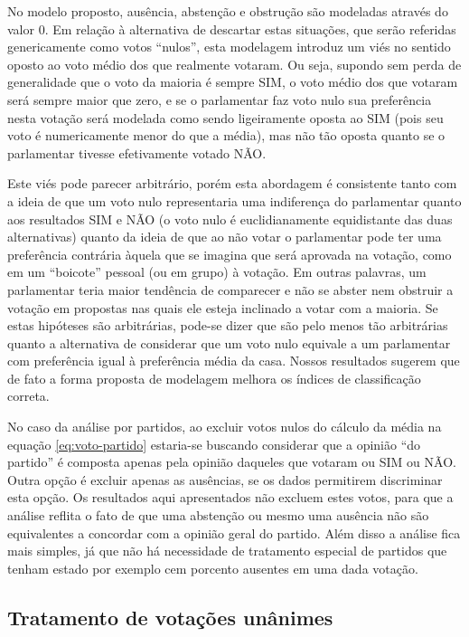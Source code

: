 \documentclass[a4paper, 12pt]{article}
\begin{document}
No modelo proposto, ausência, abstenção e obstrução são modeladas através do valor 0. Em relação à alternativa de descartar estas situações, que serão referidas genericamente como votos ``nulos'', esta modelagem introduz um viés no sentido oposto ao voto médio dos que realmente votaram. Ou seja, supondo sem perda de generalidade que o voto da maioria é sempre SIM, o voto médio dos que votaram será sempre maior que zero, e se o parlamentar faz voto nulo sua preferência nesta votação será modelada como sendo ligeiramente oposta ao SIM (pois seu voto é numericamente menor do que a média), mas não tão oposta quanto se o parlamentar tivesse efetivamente votado NÃO.

Este viés pode parecer arbitrário, porém esta abordagem é consistente tanto com a ideia de que um voto nulo representaria uma indiferença do parlamentar quanto aos resultados SIM e NÃO (o voto nulo é euclidianamente equidistante das duas alternativas) quanto da ideia de que ao não votar o parlamentar pode ter uma preferência contrária àquela que se imagina que será aprovada na votação, como em um ``boicote'' pessoal (ou em grupo) à votação. Em outras palavras, um parlamentar teria maior tendência de comparecer e não se abster nem obstruir a votação em propostas nas quais ele esteja inclinado a votar com a maioria. Se estas hipóteses são arbitrárias, pode-se dizer que são pelo menos tão arbitrárias quanto a alternativa de considerar que um voto nulo equivale a um parlamentar com preferência igual à preferência média da casa. Nossos resultados sugerem que de fato a forma proposta de modelagem melhora os índices de classificação correta.

No caso da análise por partidos, ao excluir votos nulos do cálculo da média na equação \ref{eq:voto-partido} estaria-se buscando considerar que a opinião ``do partido'' é composta apenas pela opinião daqueles que votaram ou SIM ou NÃO. Outra opção é excluir apenas as ausências, se os dados permitirem discriminar esta opção. Os resultados aqui apresentados não excluem estes votos, para que a análise reflita o fato de que uma abstenção ou mesmo uma ausência não são equivalentes a concordar com a opinião geral do partido. Além disso a análise fica mais simples, já que não há necessidade de tratamento especial de partidos que tenham estado por exemplo cem porcento ausentes em uma dada votação.



\subsection*{Tratamento de votações unânimes}
\end{document}
